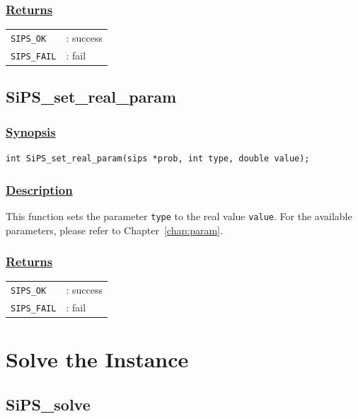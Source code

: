 \documentclass[a4paper]{book}
\begin{document}
\subsubsection{\underline{Returns}}

\begin{tabular}{ll}
  \verb+SIPS_OK+  &: success\\
  \verb+SIPS_FAIL+&: fail\\
\end{tabular}

\hypertarget{SiPS_set_real_param}{%
\subsection{SiPS\_set\_real\_param}
}


\subsubsection{\underline{Synopsis}}

\begin{verbatim}
int SiPS_set_real_param(sips *prob, int type, double value);
\end{verbatim}

\subsubsection{\underline{Description}}

This function sets the parameter \verb+type+ to the real value \verb+value+.
For the available parameters, please refer to Chapter~\ref{chap:param}.

\subsubsection{\underline{Returns}}

\begin{tabular}{ll}
  \verb+SIPS_OK+  &: success\\
  \verb+SIPS_FAIL+&: fail\\
\end{tabular}

\section{Solve the Instance}

\hypertarget{SiPS_solve}{%
\subsection{SiPS\_solve}
}
\end{document}
